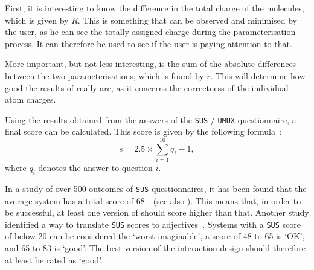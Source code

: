 First, it is interesting to know the difference in the total charge of the molecules, which is given by $R$. This is something that can be observed and minimised by the user, as he can see the totally assigned charge during the parameterisation process. It can therefore be used to see if the user is paying attention to that.

More important, but not less interesting, is the sum of the absolute differences between the two parameterisations, which is found by $r$. This will determine how good the results of \oframp{} really are, as it concerns the correctness of the individual atom charges.

Using the results obtained from the answers of the \verb|SUS| / \verb|UMUX| questionnaire, a final score can be calculated. This score is given by the following formula~\cite{sauro2011measuring}:
\[
s = 2.5 \times \sum_{i = 1}^{10} q_{i} - 1,
\]
where $q_{i}$ denotes the answer to question $i$.

In a study of over 500 outcomes of \verb|SUS| questionnaires, it has been found that the average system has a total score of $68$~\cite{sauro2011measuring}~(see also ). This means that, in order to be successful, at least one version of \oframp{} should score higher than that. Another study identified a way to translate \verb|SUS| scores to adjectives~\cite{bangor2009determining}. Systems with a \verb|SUS| score of below $20$ can be considered the `worst imaginable', a score of 48 to 65 is `OK', and 65 to 83 is `good'. The best version of the interaction design should therefore at least be rated as `good'.
